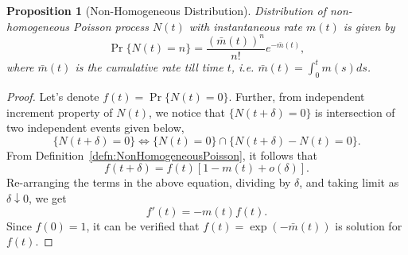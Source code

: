 \documentclass[a4paper,10pt]{article}
\theoremstyle{plain}
\newtheorem{prop}[thm]{Proposition}
\theoremstyle{definition}
\begin{document}
\begin{prop}[Non-Homogeneous Distribution] Distribution of non-homogeneous Poisson process $N(t)$ with instantaneous rate $m(t)$ is given by
 \begin{equation*}
 \Pr\{N(t)=n\}=\frac{(\bar{m}(t))^n}{n!}e^{-\bar{m}(t)},
 \end{equation*}
where $\bar{m}(t)$ is the cumulative rate till time $t$, i.e. $\bar{m}(t)=\int_{0}^{t}m(s)ds$. 
\end{prop}
\begin{proof}
Let's denote $f(t) = \Pr\{N(t)=0\}$. Further, from independent increment property of $N(t)$, we notice that $\{N(t+\delta) = 0\}$ is intersection of two independent events given below, 
\begin{equation*}
\{N(t+\delta)=0\} \iff \{N(t)=0\}\cap\{N(t+\delta)-N(t)=0\}.
\end{equation*}
From Definition~\ref{defn:NonHomogeneousPoisson}, it follows that
\begin{equation*}
 f(t+\delta) = f(t)[1 - m(t) + o(\delta)].
\end{equation*}
Re-arranging the terms in the above equation, dividing by $\delta$, and taking limit as $\delta \downarrow 0$, we get 
\begin{equation*}
f'(t) = -m(t)f(t).
\end{equation*}
Since $f(0) = 1$, it can be verified that $f(t) = \exp(-\bar{m}(t))$ is solution for $f(t)$.


\end{proof}
\end{document}
